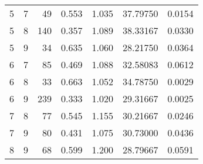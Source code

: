 \begin{longtable}{rrrrrrr}
5 & 7 & 49 & 0.553 & 1.035 & 37.79750 & 0.0154 \\ 
5 & 8 & 140 & 0.357 & 1.089 & 38.33167 & 0.0330 \\ 
5 & 9 & 34 & 0.635 & 1.060 & 28.21750 & 0.0364 \\ 
6 & 7 & 85 & 0.469 & 1.088 & 32.58083 & 0.0612 \\ 
6 & 8 & 33 & 0.663 & 1.052 & 34.78750 & 0.0029 \\ 
6 & 9 & 239 & 0.333 & 1.020 & 29.31667 & 0.0025 \\ 
7 & 8 & 77 & 0.545 & 1.155 & 30.21667 & 0.0246 \\ 
7 & 9 & 80 & 0.431 & 1.075 & 30.73000 & 0.0436 \\ 
8 & 9 & 68 & 0.599 & 1.200 & 28.79667 & 0.0591 \\ 
\bottomrule
\end{longtable}

